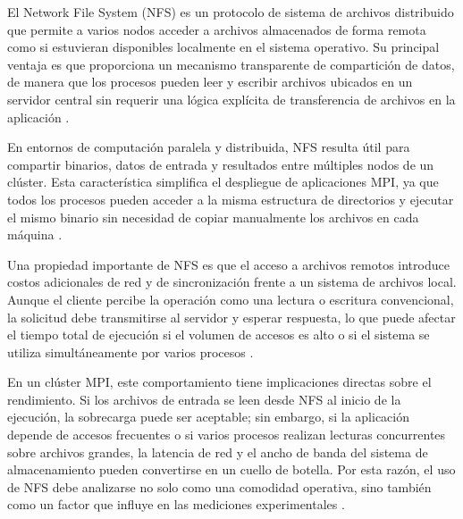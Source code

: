El Network File System (NFS) es un protocolo de sistema de archivos distribuido que permite a varios nodos acceder a archivos almacenados de forma remota como si estuvieran disponibles localmente en el sistema operativo. Su principal ventaja es que proporciona un mecanismo transparente de compartición de datos, de manera que los procesos pueden leer y escribir archivos ubicados en un servidor central sin requerir una lógica explícita de transferencia de archivos en la aplicación \parencite{sandberg1985nfs,stoner1995design}.

En entornos de computación paralela y distribuida, NFS resulta útil para compartir binarios, datos de entrada y resultados entre múltiples nodos de un clúster. Esta característica simplifica el despliegue de aplicaciones MPI, ya que todos los procesos pueden acceder a la misma estructura de directorios y ejecutar el mismo binario sin necesidad de copiar manualmente los archivos en cada máquina \parencite{tanenbaum2015distributed,storm1988nfs}.

Una propiedad importante de NFS es que el acceso a archivos remotos introduce costos adicionales de red y de sincronización frente a un sistema de archivos local. Aunque el cliente percibe la operación como una lectura o escritura convencional, la solicitud debe transmitirse al servidor y esperar respuesta, lo que puede afectar el tiempo total de ejecución si el volumen de accesos es alto o si el sistema se utiliza simultáneamente por varios procesos \parencite{tanenbaum2015distributed,stone1995filesystem}.

En un clúster MPI, este comportamiento tiene implicaciones directas sobre el rendimiento. Si los archivos de entrada se leen desde NFS al inicio de la ejecución, la sobrecarga puede ser aceptable; sin embargo, si la aplicación depende de accesos frecuentes o si varios procesos realizan lecturas concurrentes sobre archivos grandes, la latencia de red y el ancho de banda del sistema de almacenamiento pueden convertirse en un cuello de botella. Por esta razón, el uso de NFS debe analizarse no solo como una comodidad operativa, sino también como un factor que influye en las mediciones experimentales \parencite{stone1995filesystem,terry1995session}.
